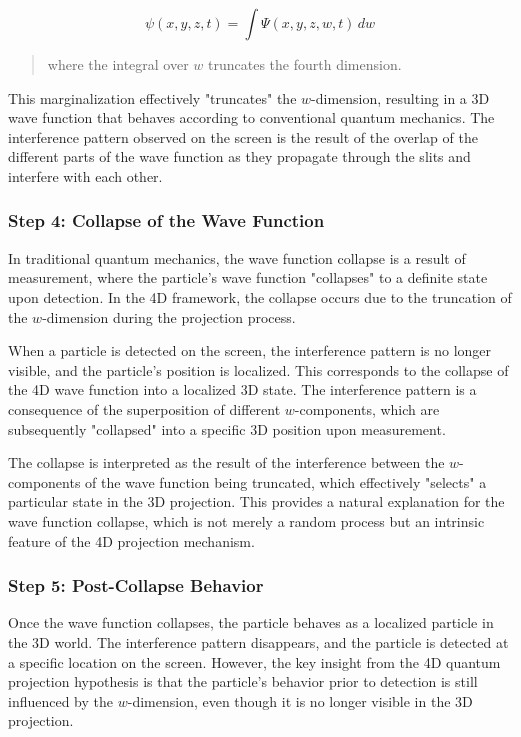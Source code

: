 \documentclass[12pt]{article}
\begin{document}
\begin{equation}
\psi(x, y, z, t) = \int \Psi(x, y, z, w, t) \, dw
\end{equation}
\begin{quote}
where the integral over \( w \) truncates the fourth dimension.
\end{quote}


This marginalization effectively "truncates" the \( w \)-dimension, resulting in a 3D wave function that behaves according to conventional quantum mechanics. The interference pattern observed on the screen is the result of the overlap of the different parts of the wave function as they propagate through the slits and interfere with each other.

\subsubsection*{Step 4: Collapse of the Wave Function}

In traditional quantum mechanics, the wave function collapse is a result of measurement, where the particle's wave function "collapses" to a definite state upon detection. In the 4D framework, the collapse occurs due to the truncation of the \( w \)-dimension during the projection process. 

When a particle is detected on the screen, the interference pattern is no longer visible, and the particle's position is localized. This corresponds to the collapse of the 4D wave function into a localized 3D state. The interference pattern is a consequence of the superposition of different \( w \)-components, which are subsequently "collapsed" into a specific 3D position upon measurement.

The collapse is interpreted as the result of the interference between the \( w \)-components of the wave function being truncated, which effectively "selects" a particular state in the 3D projection. This provides a natural explanation for the wave function collapse, which is not merely a random process but an intrinsic feature of the 4D projection mechanism.

\subsubsection*{Step 5: Post-Collapse Behavior}

Once the wave function collapses, the particle behaves as a localized particle in the 3D world. The interference pattern disappears, and the particle is detected at a specific location on the screen. However, the key insight from the 4D quantum projection hypothesis is that the particle’s behavior prior to detection is still influenced by the \( w \)-dimension, even though it is no longer visible in the 3D projection.
\end{document}
